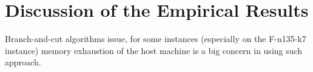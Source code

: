 \section{Discussion of the Empirical Results}
\label{sec:results-discussion}


Branch-and-cut algorithms issue, for some instances (especially on the F-n135-k7 instance)
memory exhaustion of the host machine is a big concern in using such approach.

